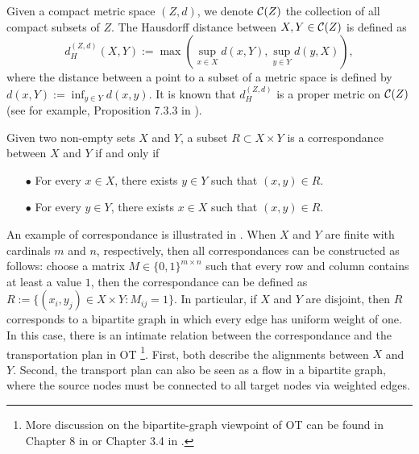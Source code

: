 Given a compact metric space $(Z, d)$, we denote $\mathcal C(Z)$ the collection of all compact subsets of
$Z$. The Hausdorff distance between $X, Y \in \mathcal C(Z)$ is defined as
\begin{equation}
    d_{H}^{(Z, d)}(X,Y) := \max \left( \sup_{x \in X} d(x,Y), \sup_{y \in Y} d(y,X) \right),
\end{equation}
where the distance between a point to a subset of a metric space is defined by
$d(x,Y) := \inf_{y \in Y} d(x,y)$.
It is known that $d_{H}^{(Z, d)}$ is a proper metric on $\mathcal C(Z)$ (see for example,
Proposition 7.3.3 in \citep{Burago01}).
\begin{definition}[Correspondance]
Given two non-empty sets $X$ and $Y$,
a subset $R \subset X \times Y$ is a correspondance between $X$ and $Y$ if and only if
\begin{itemize}
    \item[$\bullet$] For every $x \in X$, there exists $y \in Y$ such that $(x,y) \in R$.
    \item[$\bullet$] For every $y \in Y$, there exists $x \in X$ such that $(x,y) \in R$.
\end{itemize}
\end{definition}
An example of correspondance is illustrated in .
When $X$ and $Y$ are finite with cardinals $m$ and $n$, respectively,
then all correspondances can be constructed as follows:
choose a matrix $M \in \{0,1 \}^{m \times n}$ such that every row and column
contains at least a value $1$, then the correspondance can be defined as
$R:= \{(x_i, y_j) \in X \times Y: M_{ij} = 1 \}$. In particular, if $X$ and $Y$ are disjoint,
then $R$ corresponds to a bipartite graph in which every edge has uniform weight of one.
In this case, there is an intimate relation between the correspondance
and the transportation plan in OT
\footnote{More discussion on the bipartite-graph viewpoint of OT can be found in
Chapter 8 in \citep{Brualdi06} or Chapter 3.4 in \citep{Peyre19}.}.
First, both describe the alignments between $X$ and $Y$.
Second, the transport plan can also be seen as a flow in a bipartite graph,
where the source nodes must be connected to all target nodes via weighted edges.

